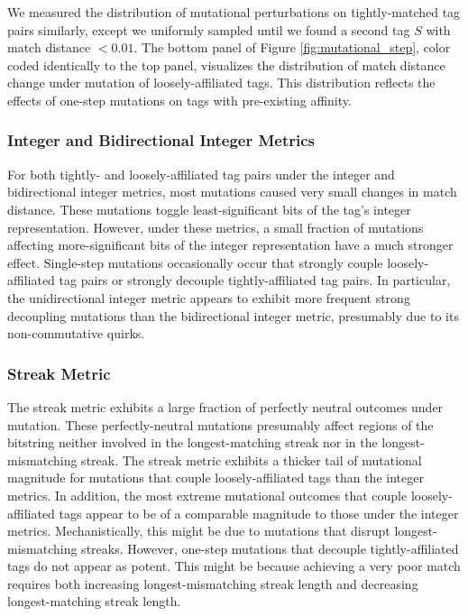 We measured the distribution of mutational perturbations on tightly-matched tag pairs similarly, except we uniformly sampled until we found a second tag $S$ with match distance $< 0.01$.
The bottom panel of Figure \ref{fig:mutational_step}, color coded identically to the top panel, visualizes the distribution of match distance change under mutation of loosely-affiliated tags.
This distribution reflects the effects of one-step mutations on tags with pre-existing affinity.

\subsubsection{Integer and Bidirectional Integer Metrics}

For both tightly- and loosely-affiliated tag pairs under the integer and bidirectional integer metrics, most mutations caused very small changes in match distance.
These mutations toggle least-significant bits of the tag's integer representation.
However, under these metrics, a small fraction of mutations affecting more-significant bits of the integer representation have a much stronger effect.
Single-step mutations occasionally occur that strongly couple loosely-affiliated tag pairs or strongly decouple tightly-affiliated tag pairs.
In particular, the unidirectional integer metric appears to exhibit more frequent strong decoupling mutations than the bidirectional integer metric, presumably due to its non-commutative quirks.

\subsubsection{Streak Metric}

The streak metric exhibits a large fraction of perfectly neutral outcomes under mutation.
These perfectly-neutral mutations presumably affect regions of the bitstring neither involved in the longest-matching streak nor in the longest-mismatching streak.
The streak metric exhibits a thicker tail of mutational magnitude for mutations that couple loosely-affiliated tags than the integer metrics.
In addition, the most extreme mutational outcomes that couple loosely-affiliated tags appear to be of a comparable magnitude to those under the integer metrics.
Mechanistically, this might be due to mutations that disrupt longest-mismatching streaks.
However, one-step mutations that decouple tightly-affiliated tags do not appear as potent.
This might be because achieving a very poor match requires both increasing longest-mismatching streak length and decreasing longest-matching streak length.

